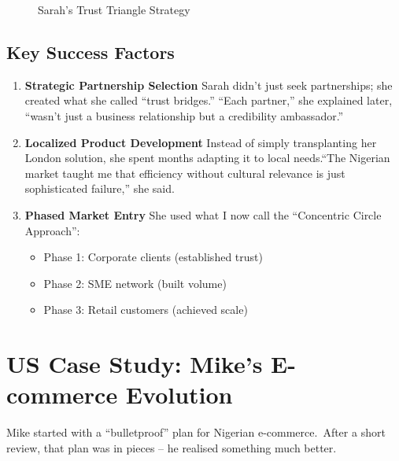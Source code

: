 \begin{figure}[h]
    \centering
    \caption{Sarah's Trust Triangle Strategy}\label{fig:trust-triangle}
\end{figure}

\subsection{Key Success Factors}\label{subsec:key-success-factors}
\begin{enumerate}
    \item \textbf{Strategic Partnership Selection}
    Sarah didn't just seek partnerships; she created what she called ``trust bridges.'' ``Each partner,'' she explained later, ``wasn't just a business relationship but a credibility ambassador.''

    \item \textbf{Localized Product Development}
    Instead of simply transplanting her London solution, she spent months adapting it to local needs.``The Nigerian market taught me that efficiency without cultural relevance is just sophisticated failure,'' she said.

    \item \textbf{Phased Market Entry}
    She used what I now call the ``Concentric Circle Approach'':
    \begin{itemize}
        \item Phase 1: Corporate clients (established trust)
        \item Phase 2: SME network (built volume)
        \item Phase 3: Retail customers (achieved scale)
    \end{itemize}
\end{enumerate}

\section{US Case Study: Mike's E-commerce Evolution}\label{sec:us-case-study:-mike's-e-commerce-evolution}

Mike started with a ``bulletproof'' plan for Nigerian e-commerce.\ After a short review, that plan was in pieces – he realised something much better.

